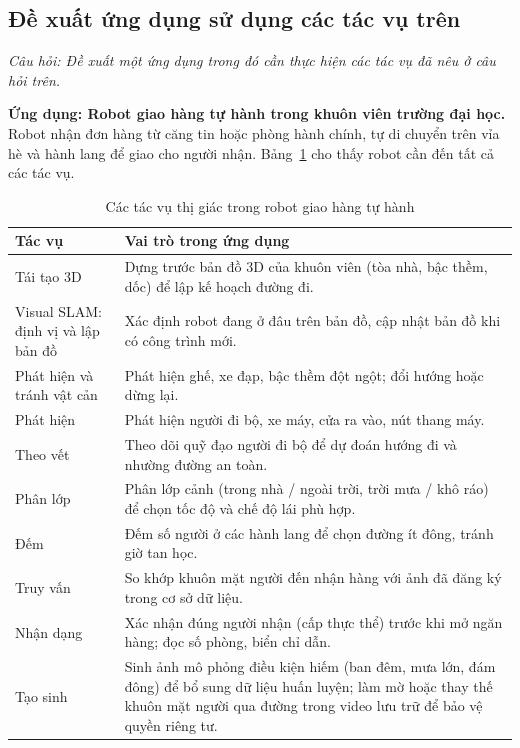 \subsection{Đề xuất ứng dụng sử dụng các tác vụ trên}
\label{subsec:w2_tasks_app}

\textit{Câu hỏi: Đề xuất một ứng dụng trong đó cần thực hiện các tác vụ đã nêu ở câu hỏi trên.}

\textbf{Ứng dụng: Robot giao hàng tự hành trong khuôn viên trường đại học.} Robot nhận đơn hàng từ căng tin hoặc phòng hành chính, tự di chuyển trên vỉa hè và hành lang để giao cho người nhận. Bảng~\ref{tab:w2_robot} cho thấy robot cần đến tất cả các tác vụ.

\begin{table}[ht]
\centering
\small
\caption{Các tác vụ thị giác trong robot giao hàng tự hành}
\label{tab:w2_robot}
\renewcommand{\arraystretch}{1.3}
\begin{tabularx}{\textwidth}{|>{\raggedright\arraybackslash}p{3.2cm}|X|}
\hline
\textbf{Tác vụ} & \textbf{Vai trò trong ứng dụng} \\
\hline
Tái tạo 3D & Dựng trước bản đồ 3D của khuôn viên (tòa nhà, bậc thềm, dốc) để lập kế hoạch đường đi. \\
\hline
Visual SLAM: định vị và lập bản đồ & Xác định robot đang ở đâu trên bản đồ, cập nhật bản đồ khi có công trình mới. \\
\hline
Phát hiện và tránh vật cản & Phát hiện ghế, xe đạp, bậc thềm đột ngột; đổi hướng hoặc dừng lại. \\
\hline
Phát hiện & Phát hiện người đi bộ, xe máy, cửa ra vào, nút thang máy. \\
\hline
Theo vết & Theo dõi quỹ đạo người đi bộ để dự đoán hướng đi và nhường đường an toàn. \\
\hline
Phân lớp & Phân lớp cảnh (trong nhà / ngoài trời, trời mưa / khô ráo) để chọn tốc độ và chế độ lái phù hợp. \\
\hline
Đếm & Đếm số người ở các hành lang để chọn đường ít đông, tránh giờ tan học. \\
\hline
Truy vấn & So khớp khuôn mặt người đến nhận hàng với ảnh đã đăng ký trong cơ sở dữ liệu. \\
\hline
Nhận dạng & Xác nhận đúng người nhận (cấp thực thể) trước khi mở ngăn hàng; đọc số phòng, biển chỉ dẫn. \\
\hline
Tạo sinh & Sinh ảnh mô phỏng điều kiện hiếm (ban đêm, mưa lớn, đám đông) để bổ sung dữ liệu huấn luyện; làm mờ hoặc thay thế khuôn mặt người qua đường trong video lưu trữ để bảo vệ quyền riêng tư. \\
\hline
\end{tabularx}
\end{table}

